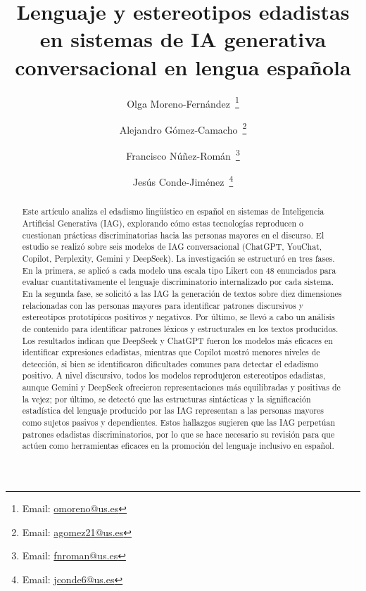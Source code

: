 \documentclass[spanish]{textolivre}
\title{Lenguaje y estereotipos edadistas en sistemas de IA generativa conversacional en lengua española}
\author[1]{Olga Moreno-Fernández~\orcid{0000-0003-4349-8657}\thanks{Email: \href{mailto:omoreno@us.es}{omoreno@us.es}}}
\author[1]{Alejandro Gómez-Camacho~\orcid{0000-0002-6431-6405}\thanks{Email: \href{mailto:agomez21@us.es}{agomez21@us.es}}}
\author[1]{Francisco Núñez-Román~\orcid{0000-0002-2943-1037}\thanks{Email: \href{mailto:fnroman@us.es}{fnroman@us.es}}}
\author[1]{Jesús Conde-Jiménez~\orcid{0000-0002-4471-5089}\thanks{Email: \href{mailto:jconde6@us.es}{jconde6@us.es}}}
\affil[1]{Universidad de  Sevilla, Facultad de Ciencias de la Educación, Sevilla, España.}
\begin{document}
\maketitle

\begin{polyabstract}
\begin{abstract}
Este artículo analiza el edadismo lingüístico en español en sistemas de Inteligencia Artificial Generativa (IAG), explorando cómo estas tecnologías reproducen o cuestionan prácticas discriminatorias hacia las personas mayores en el discurso. El estudio se realizó sobre seis modelos de IAG conversacional (ChatGPT, YouChat, Copilot, Perplexity, Gemini y DeepSeek). La investigación se estructuró en tres fases. En la primera, se aplicó a cada modelo una escala tipo Likert con 48 enunciados para evaluar cuantitativamente el lenguaje discriminatorio internalizado por cada sistema. En la segunda fase, se solicitó a las IAG la generación de textos sobre diez dimensiones relacionadas con las personas mayores para identificar patrones discursivos y estereotipos prototípicos positivos y negativos. Por último, se llevó a cabo un análisis de contenido para identificar patrones léxicos y estructurales en los textos producidos. Los resultados indican que DeepSeek y ChatGPT fueron los modelos más eficaces en identificar expresiones edadistas, mientras que Copilot mostró menores niveles de detección, si bien se identificaron dificultades comunes para detectar el edadismo positivo. A nivel discursivo, todos los modelos reprodujeron estereotipos edadistas, aunque Gemini y DeepSeek ofrecieron representaciones más equilibradas y positivas de la vejez; por último, se detectó que las estructuras sintácticas y la significación estadística del lenguaje producido por las IAG representan a las personas mayores como sujetos pasivos y dependientes. Estos hallazgos sugieren que las IAG perpetúan patrones edadistas discriminatorios, por lo que se hace necesario su revisión para que actúen como herramientas eficaces en la promoción del lenguaje inclusivo en español.

\end{abstract}


\end{polyabstract}
\end{document}
